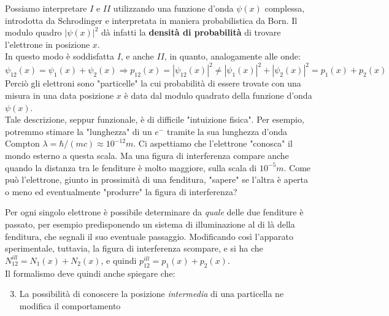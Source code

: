 \documentclass[FisicaTeorica.tex]{subfiles}
\begin{document}
Possiamo interpretare $I$ e $II$ utilizzando una funzione d'onda $\psi(x)$ complessa, introdotta da Schrodinger e interpretata in maniera probabilistica da Born. Il modulo quadro $|\psi(x)|^2$ dà infatti la \textbf{densità di probabilità} di trovare l'elettrone in posizione $x$.\\
In questo modo è soddisfatta $I$, e anche $II$, in quanto, analogamente alle onde:
\[
\psi_{12}(x) = \psi_1(x) + \psi_2(x) \Rightarrow p_{12}(x) = |\psi_{12}(x)|^2 \neq |\psi_1(x)|^2 + |\psi_2(x)|^2 = p_1(x) + p_2(x)
\]
Perciò gli elettroni sono "particelle" la cui probabilità di essere trovate con una misura in una data posizione $x$ è data dal modulo quadrato della funzione d'onda $\psi(x)$.\\
Tale descrizione, seppur funzionale, è di difficile "intuizione fisica". Per esempio, potremmo stimare la "lunghezza" di un $e^-$ tramite la sua lunghezza d'onda Compton $\lambda = \hbar/(mc) \approx 10^{-12}m$. Ci aspettiamo che l'elettrone "conosca" il mondo esterno a questa scala. Ma una figura di interferenza compare anche quando la distanza tra le fenditure è molto maggiore, sulla scala di $10^{-5}m$. Come può l'elettrone, giunto in prossimità di una fenditura, "sapere" se l'altra è aperta o meno ed eventualmente "produrre" la figura di interferenza?

Per ogni singolo elettrone è possibile determinare da \textit{quale} delle due fenditure è passato, per esempio predisponendo un sistema di illuminazione al di là della fenditura, che segnali il suo eventuale passaggio. Modificando così l'apparato sperimentale, tuttavia, la figura di interferenza scompare, e si ha che $N_{12}^{ill} = N_1(x) + N_2(x)$, e quindi $p_{12}^{ill} = p_1(x) + p_2(x)$.\\
Il formalismo deve quindi anche spiegare che:
\begin{enumerate}[I]
\setcounter{enumi}{2}
    \item La possibilità  di conoscere la posizione \textit{intermedia} di una particella ne modifica il comportamento
\end{enumerate}
\end{document}
